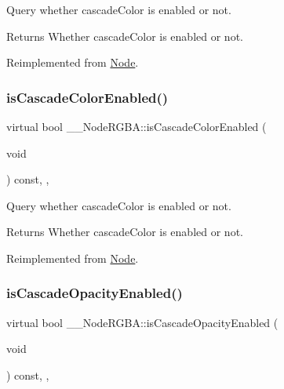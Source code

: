 Query whether cascade\+Color is enabled or not. \begin{DoxyReturn}{Returns}
Whether cascade\+Color is enabled or not. 
\end{DoxyReturn}


Reimplemented from \hyperlink{classNode_abf874f1b388e773ca80732b1134508be}{Node}.

\mbox{\label{class____NodeRGBA_a24f2ae00f1994d6601ce8e1f089dafe1}} 
\subsubsection{\texorpdfstring{is\+Cascade\+Color\+Enabled()}{isCascadeColorEnabled()}\hspace{0.1cm}{\footnotesize\ttfamily [2/2]}}
{\footnotesize\ttfamily virtual bool \+\_\+\+\_\+\+Node\+R\+G\+B\+A\+::is\+Cascade\+Color\+Enabled (\begin{DoxyParamCaption}\item[{void}]{ }\end{DoxyParamCaption}) const\hspace{0.3cm}{\ttfamily [inline]}, {\ttfamily [override]}, {\ttfamily [virtual]}}

Query whether cascade\+Color is enabled or not. \begin{DoxyReturn}{Returns}
Whether cascade\+Color is enabled or not. 
\end{DoxyReturn}


Reimplemented from \hyperlink{classNode_abf874f1b388e773ca80732b1134508be}{Node}.

\mbox{\label{class____NodeRGBA_a421ef9c26c9860deb23184727d573415}} 
\subsubsection{\texorpdfstring{is\+Cascade\+Opacity\+Enabled()}{isCascadeOpacityEnabled()}\hspace{0.1cm}{\footnotesize\ttfamily [1/2]}}
{\footnotesize\ttfamily virtual bool \+\_\+\+\_\+\+Node\+R\+G\+B\+A\+::is\+Cascade\+Opacity\+Enabled (\begin{DoxyParamCaption}\item[{void}]{ }\end{DoxyParamCaption}) const\hspace{0.3cm}{\ttfamily [inline]}, {\ttfamily [override]}, {\ttfamily [virtual]}}

